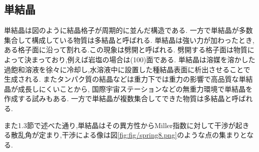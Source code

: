 \subsection{単結晶}
単結晶は図のように結晶格子が周期的に並んだ構造である.
一方で単結晶が多数集合して構成している物質は多結晶と呼ばれる.
単結晶は強い力が加わったとき,ある格子面に沿って割れる.この現象は劈開と呼ばれる.
劈開する格子面は物質によって決まっており,例えば岩塩の場合は(100)面である.\cite{hekikai}
単結晶は溶媒を溶かした過飽和溶液を徐々に冷却し,水溶液中に設置した種結晶表面に析出させることで生成される.\cite{sakusei}
またタンパク質の結晶などは重力下では重力の影響で高品質な単結晶が成長しにくいことから,
国際宇宙ステーションなどの無重力環境で単結晶を作成する試みもある.\cite{jaxa:online}
一方で単結晶が複数集合してできた物質は多結晶と呼ばれる.

また1.3節で述べた通り,単結晶はその異方性からMiller指数に対して干渉が起きる散乱角が定まり,干渉による像は図\ref{fig:fig/spring8.png}のような点の集まりとなる.
